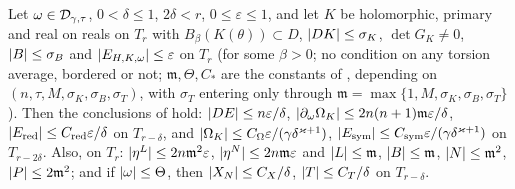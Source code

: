 \begin{lemma}\label{bpI:p1:geometry-noA5}
Let $\omega\in\mathcal{D}_{\gamma,\tau}$, $0<\delta\le1$, $2\delta<r$, $0\le\varepsilon\le1$, and let $K$ be holomorphic, primary and real on reals on $T_r$ with $B_\beta(K(\theta))\subset D$, $\lvert DK\rvert\le\sigma_K$, $\det G_K\ne0$, $\lvert B\rvert\le\sigma_B$ and $\lvert E_{H,K,\omega}\rvert\le\varepsilon$ on $T_r$
(for some $\beta>0$; no condition on any torsion average, bordered or not; $\mathfrak m,\Theta,C_*$ are the constants of , depending on $(n,\tau,M,\sigma_K,\sigma_B,\sigma_T)$, with $\sigma_T$ entering only through $\mathfrak m=\max\{1,M,\sigma_K,\sigma_B,\sigma_T\}$). Then the conclusions of  hold:
$\lvert DE\rvert\le n\varepsilon/\delta$, $\lvert \partial_\omega\Omega_K\rvert\le 2n(n+1)\mathfrak m\varepsilon/\delta$, $\lvert E_{\mathrm{red}}\rvert\le C_{\mathrm{red}}\varepsilon/\delta$ on $T_{r-\delta}$, and
$\lvert \Omega_K\rvert\le C_\Omega\varepsilon/(\gamma\delta^{\varkappa+1})$, $\lvert E_{\mathrm{sym}}\rvert\le C_{\mathrm{sym}}\varepsilon/(\gamma\delta^{\varkappa+1})$ on $T_{r-2\delta}$.
Also, on $T_r$: $\lvert \eta^L\rvert\le2n\mathfrak m^2\varepsilon$, $\lvert \eta^N\rvert\le2n\mathfrak m\varepsilon$ and $\lvert L\rvert\le\mathfrak m$, $\lvert B\rvert\le\mathfrak m$, $\lvert N\rvert\le\mathfrak m^2$, $\lvert P\rvert\le2\mathfrak m^2$; and if $\lvert \omega\rvert\le\Theta$, then $\lvert X_N\rvert\le C_X/\delta$, $\lvert T\rvert\le C_T/\delta$ on $T_{r-\delta}$.
\end{lemma}
